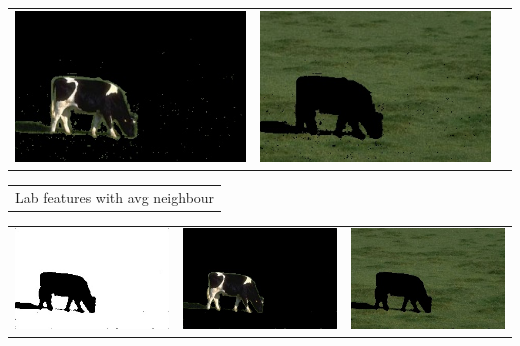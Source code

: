 \documentclass{article}
\begin{document}
\begin{center}
\begin{tabular}{c c c}
 \includegraphics[width=.37\linewidth]{../image-segmentation/output/add-Lab-neighbor-diff-feature/cow_seg1.jpg} & \includegraphics[width=.37\linewidth]{../image-segmentation/output/add-Lab-neighbor-diff-feature/cow_seg2.jpg} \\
  
 \end{tabular}
 \begin{tabular}{c}

Lab features with avg neighbour \\
\end{tabular}
 \begin{tabular}{c c c} 

 \includegraphics[width=.37\linewidth]{../image-segmentation/output/add-Lab-neighbor-avg-feature/cow_mask.jpg} & 
 
 \includegraphics[width=.37\linewidth]{../image-segmentation/output/add-Lab-neighbor-avg-feature/cow_seg1.jpg} & \includegraphics[width=.37\linewidth]{../image-segmentation/output/add-Lab-neighbor-avg-feature/cow_seg2.jpg} \\
  
 \end{tabular}
 
 
\end{center}
\end{document}
